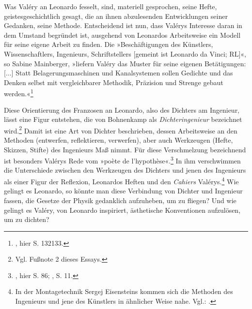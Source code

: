 \documentclass[%
	fontsize=10pt,%
	twoside,%
	headings=optiontoheadandtoc,%
	showtrims]{scrbook}
\begin{document}
\par Was Valéry an Leonardo fesselt, sind, materiell gesprochen, seine Hefte, geistesgeschichtlich gesagt, die an ihnen abzulesenden Entwicklungen seiner Gedanken, seine Methode. Entscheidend ist nun, dass Valérys Interesse daran in dem Umstand begründet ist, ausgehend von Leonardos Arbeitsweise ein Modell für seine eigene Arbeit zu finden. Die »Beschäftigungen des Künstlers, Wissenschaftlers, Ingenieurs, Schriftstellers {[}gemeint ist Leonardo da Vinci; RL{]}«, so Sabine Mainberger, »liefern Valéry das Muster für seine eigenen Betätigungen: {[}...{]} Statt Belagerungsmaschinen und Kanalsystemen sollen Gedichte und das Denken selbst mit vergleichbarer Methodik, Präzision und Strenge gebaut werden.«\footnote{\cite[][]{mainberger2009a}, hier S. 132\textendash{}133.} \par Diese Orientierung des Franzosen an Leonardo, also des Dichters am Ingenieur, lässt eine Figur entstehen, die von Bohnenkamp als \emph{Dichteringenieur} bezeichnet wird.\footnote{Vgl. Fußnote 2 dieses Essays.}  Damit ist eine Art von Dichter beschrieben, dessen Arbeitsweise an den Methoden (entwerfen, reflektieren, verwerfen), aber auch Werkzeugen (Hefte, Skizzen, Stifte) des Ingenieurs Maß nimmt. Für diese Verschmelzung bezeichnend ist besonders Valérys Rede vom »poète de l\textquoteright{}hypothèse«.\footnote{\cite[][]{val1931a}, hier S. 86; \cite[][]{val1942a}, S. 11.}  In ihm verschwimmen die Unterschiede zwischen den Werkzeugen des Dichters und jenen des Ingenieurs als einer Figur der Reflexion, Leonardos Heften und den \emph{Cahiers} Valérys.\footnote{In der Montagetechnik Sergej Eisensteins kommen sich die Methoden des Ingenieurs und jene des Künstlers in ähnlicher Weise nahe. Vgl.: \cite[][]{steiner1996a}.}  Wie gelingt es Leonardo, so könnte man diese Verbindung von Dichter und Ingenieur fassen, die Gesetze der Physik gedanklich aufzuheben, um zu fliegen? Und wie gelingt es Valéry, von Leonardo inspiriert, ästhetische Konventionen aufzulösen, um zu dichten?
\end{document}
